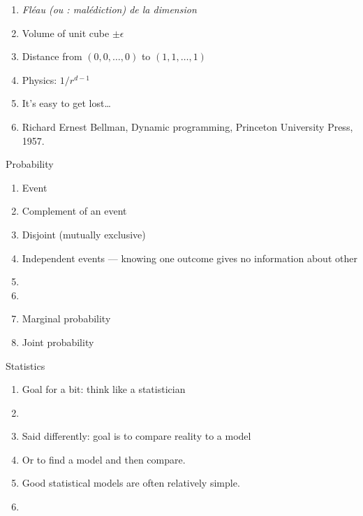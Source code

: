 \begin{enumerate}
\item \textit{Fléau (ou : malédiction) de la dimension}
\item Volume of unit cube $\pm\epsilon$
\item Distance from $(0,0,\ldots,0)$ to $(1,1,\ldots,1)$
\item Physics: $1/r^{d-1}$
\item It's easy to get lost\dots
\item Richard Ernest Bellman, Dynamic programming, Princeton
  University Press, 1957.
\end{enumerate}

Probability
\begin{enumerate}
\item Event
\item Complement of an event
\item Disjoint (mutually exclusive)
\item Independent events --- knowing one outcome gives no information about other
\item {}
\item {}
\item Marginal probability
\item Joint probability
\end{enumerate}

Statistics
\begin{enumerate}
\item Goal for a bit: think like a statistician
\item {}
\item Said differently: goal is to compare reality to a model
\item Or to find a model and then compare.
\item Good statistical models are often relatively simple.
\item {}
\end{enumerate}

